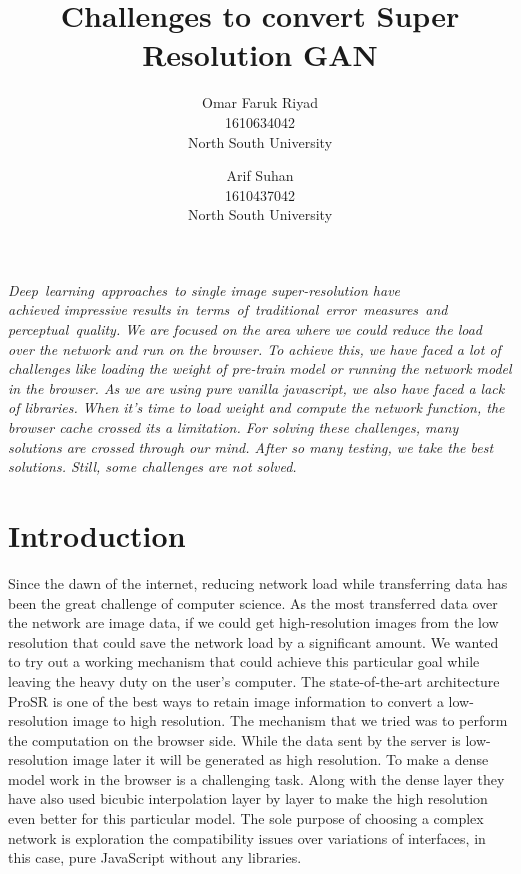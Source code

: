 \documentclass[a4paper,12pt]{article}
\title
{
	Challenges to convert Super Resolution GAN
}
\author
{
	Omar Faruk Riyad  \\
	1610634042 \\ 
	North South University  \\
	\and 
	Arif Suhan \\
	1610437042 \\
	North South University  \\
}
\providecommand{\keywords}[1]{\textbf{\textit{Keywords:}} #1}
\begin{document}
\maketitle

\abstract
{
	\textit{
	Deep learning approaches to single image super-resolution have\\
    achieved impressive results in terms of traditional error measures and\\
    perceptual quality. We are focused on the area where we could reduce the load over the network and run on the browser. To achieve this, we have faced a lot of challenges like loading the weight of pre-train model or running the network model in the browser. As we are using pure vanilla javascript, we also have faced a lack of libraries. When it’s time to load weight and compute the network function, the browser cache crossed its a limitation. For solving these challenges, many solutions are crossed through our mind. After so many testing, we take the best solutions. Still, some challenges are not solved.
	}
} 


\section{Introduction}
Since the dawn of the internet, reducing network load while transferring data has been the great challenge of computer science. As the most transferred data over the network are image data, if we could get high-resolution images from the low resolution that could save the network load by a significant amount. We wanted to try out a working mechanism that could achieve this particular goal while leaving the heavy duty on the user's computer. The state-of-the-art architecture ProSR is one of the best ways to retain image information to convert a low-resolution image to high resolution. The mechanism that we tried was to perform the computation on the browser side. While the data sent by the server is low-resolution image later it will be generated as high resolution. To make a dense model work in the browser is a challenging task. Along with the dense layer they have also used bicubic interpolation layer by layer to make the high resolution even better for this particular model. The sole purpose of choosing a complex network is exploration the compatibility issues over variations of interfaces, in this case, pure JavaScript without any libraries.
\end{document}
